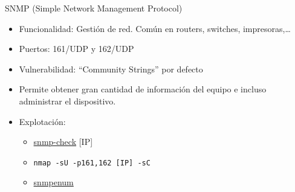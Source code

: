 \documentclass[aspectratio=169,11pt]{beamer}
\newcommand{\cmd}[1]{\texttt{#1}}
\begin{document}

\begin{frame}[allowframebreaks]{SNMP (Simple Network Management Protocol)}
\small
  \begin{itemize}
  \item Funcionalidad: Gestión de red. Común en routers, switches, impresoras,\dots{}
  \item Puertos: 161/UDP y 162/UDP
  \item Vulnerabilidad: ``Community Strings'' por defecto
  \item Permite obtener gran cantidad de información del equipo e incluso administrar el dispositivo.
  \item Explotación:
    \begin{itemize}
    \item \href{https://tools.kali.org/information-gathering/snmp-check}{snmp-check} [IP]
    \item \cmd{nmap -sU -p161,162 [IP] -sC}
    \item \href{https://gitlab.com/kalilinux/packages/snmpenum}{snmpenum}
    \end{itemize}
  \end{itemize}
\end{frame}

\end{document}
